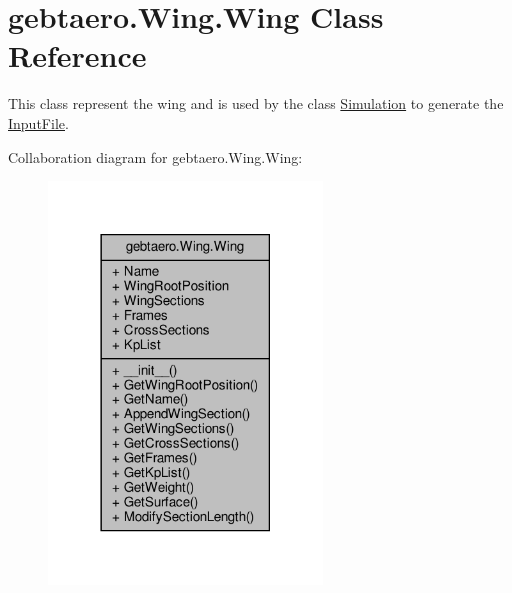 \hypertarget{classgebtaero_1_1_wing_1_1_wing}{}\section{gebtaero.\+Wing.\+Wing Class Reference}
\label{classgebtaero_1_1_wing_1_1_wing}


This class represent the wing and is used by the class \hyperlink{namespacegebtaero_1_1_simulation}{Simulation} to generate the \hyperlink{namespacegebtaero_1_1_input_file}{Input\+File}.  




Collaboration diagram for gebtaero.\+Wing.\+Wing\+:\nopagebreak
\begin{figure}[H]
\begin{center}
\leavevmode
\includegraphics[width=206pt]{classgebtaero_1_1_wing_1_1_wing__coll__graph}
\end{center}
\end{figure}
